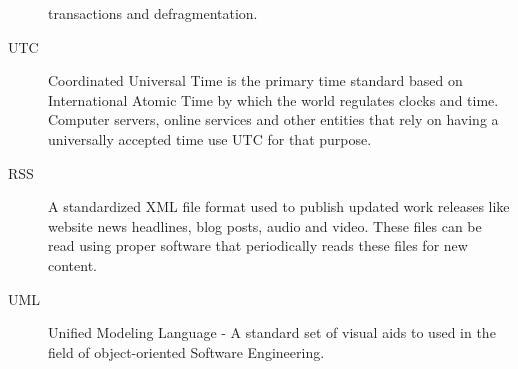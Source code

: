 \begin{description}
transactions and defragmentation.
\item[UTC] Coordinated Universal Time is the primary time standard based on
International Atomic Time by which the world regulates clocks and time. Computer
servers, online services and other entities that rely on having a universally
accepted time use UTC for that purpose.
\item[RSS] A standardized XML file format used to publish updated work releases
like website news headlines, blog posts, audio and video. These files can be
read using proper software that periodically reads these files for new content.
\item[UML] Unified Modeling Language - A standard set of visual aids to used in
the field of object-oriented Software Engineering.
\end{description}